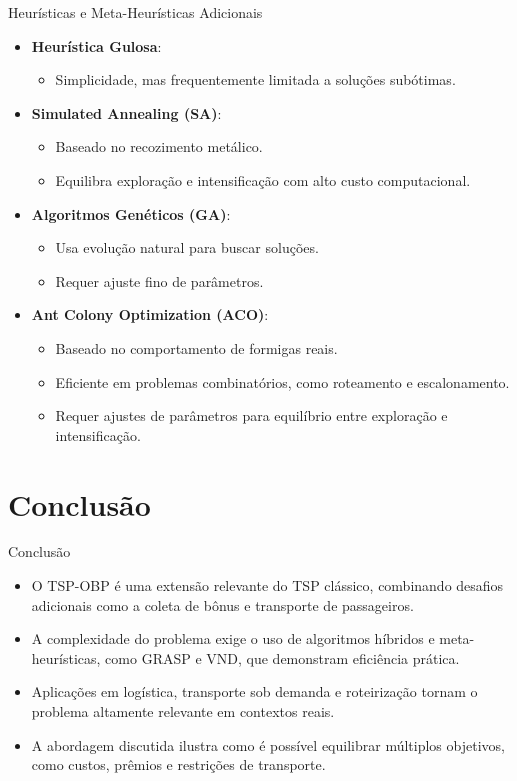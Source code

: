 \documentclass[aspectratio=169,xcolor=table]{beamer}
\begin{document}
\begin{frame}{Heurísticas e Meta-Heurísticas Adicionais}
    \begin{itemize}
        \item \textbf{Heurística Gulosa}:
        \begin{itemize}
            \item Simplicidade, mas frequentemente limitada a soluções subótimas.
        \end{itemize}
        \item \textbf{Simulated Annealing (SA)}:
        \begin{itemize}
            \item Baseado no recozimento metálico.
            \item Equilibra exploração e intensificação com alto custo computacional.
        \end{itemize}
        \item \textbf{Algoritmos Genéticos (GA)}:
        \begin{itemize}
            \item Usa evolução natural para buscar soluções.
            \item Requer ajuste fino de parâmetros.
        \end{itemize}
        \item \textbf{Ant Colony Optimization (ACO)}:
        \begin{itemize}
            \item Baseado no comportamento de formigas reais.
            \item Eficiente em problemas combinatórios, como roteamento e escalonamento.
            \item Requer ajustes de parâmetros para equilíbrio entre exploração e intensificação.
        \end{itemize}
    \end{itemize}
\end{frame}

\section{Conclusão}

\begin{frame}{Conclusão}
    \begin{itemize}
        \item O TSP-OBP é uma extensão relevante do TSP clássico, combinando desafios adicionais como a coleta de bônus e transporte de passageiros.
        \item A complexidade do problema exige o uso de algoritmos híbridos e meta-heurísticas, como GRASP e VND, que demonstram eficiência prática.
        \item Aplicações em logística, transporte sob demanda e roteirização tornam o problema altamente relevante em contextos reais.
        \item A abordagem discutida ilustra como é possível equilibrar múltiplos objetivos, como custos, prêmios e restrições de transporte.
    \end{itemize}
\end{frame}
\end{document}
